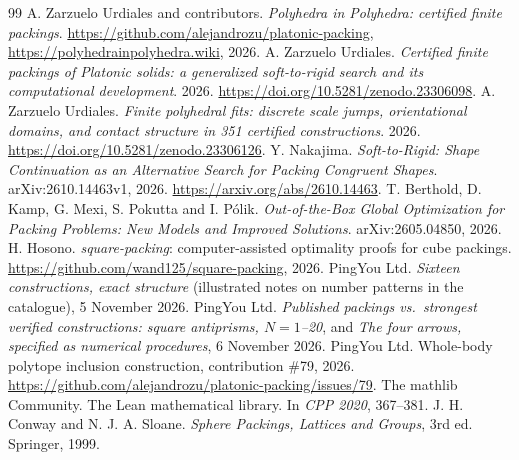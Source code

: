 \documentclass[11pt,a4paper]{article}
\theoremstyle{definition}
\theoremstyle{remark}
\begin{document}
\begin{thebibliography}{99}
 A. Zarzuelo Urdiales and contributors. \emph{Polyhedra in Polyhedra: certified finite packings}. \url{https://github.com/alejandrozu/platonic-packing}, \url{https://polyhedrainpolyhedra.wiki}, 2026.
 A. Zarzuelo Urdiales. \emph{Certified finite packings of Platonic solids: a generalized soft-to-rigid search and its computational development}. 2026. \url{https://doi.org/10.5281/zenodo.23306098}.
 A. Zarzuelo Urdiales. \emph{Finite polyhedral fits: discrete scale jumps, orientational domains, and contact structure in 351 certified constructions}. 2026. \url{https://doi.org/10.5281/zenodo.23306126}.
 Y. Nakajima. \emph{Soft-to-Rigid: Shape Continuation as an Alternative Search for Packing Congruent Shapes}. arXiv:2610.14463v1, 2026. \url{https://arxiv.org/abs/2610.14463}.
 T. Berthold, D. Kamp, G. Mexi, S. Pokutta and I. P\'olik. \emph{Out-of-the-Box Global Optimization for Packing Problems: New Models and Improved Solutions}. arXiv:2605.04850, 2026.
 H. Hosono. \emph{square-packing}: computer-assisted optimality proofs for cube packings. \url{https://github.com/wand125/square-packing}, 2026.
 PingYou Ltd. \emph{Sixteen constructions, exact structure} (illustrated notes on number patterns in the catalogue), 5 November 2026.
 PingYou Ltd. \emph{Published packings vs.\ strongest verified constructions: square antiprisms, $N=1$--20}, and \emph{The four arrows, specified as numerical procedures}, 6 November 2026.
 PingYou Ltd. Whole-body polytope inclusion construction, contribution \#79, 2026. \url{https://github.com/alejandrozu/platonic-packing/issues/79}.
 The mathlib Community. The Lean mathematical library. In \emph{CPP 2020}, 367--381.
 J. H. Conway and N. J. A. Sloane. \emph{Sphere Packings, Lattices and Groups}, 3rd ed. Springer, 1999.
\end{thebibliography}
\end{document}
